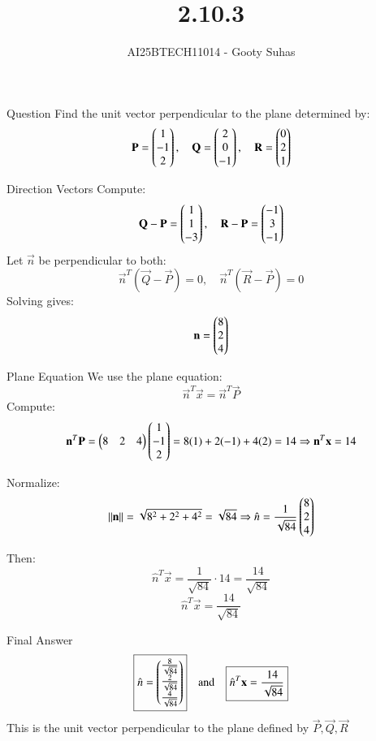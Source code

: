 \documentclass{beamer}
\title{2.10.3}
\author{AI25BTECH11014 - Gooty Suhas}
\begin{document}
\frame{\titlepage}

\begin{frame}{Question}
Find the unit vector perpendicular to the plane determined by:
\[
\mathbf{P} = \begin{pmatrix}1 \\ -1 \\ 2\end{pmatrix},\quad
\mathbf{Q} = \begin{pmatrix}2 \\ 0 \\ -1\end{pmatrix},\quad
\mathbf{R} = \begin{pmatrix}0 \\ 2 \\ 1\end{pmatrix}
\]
\end{frame}



\begin{frame}{Direction Vectors}
Compute:
\[
\mathbf{Q} - \mathbf{P} = \begin{pmatrix}1 \\ 1 \\ -3\end{pmatrix},\quad
\mathbf{R} - \mathbf{P} = \begin{pmatrix}-1 \\ 3 \\ -1\end{pmatrix}
\]
Let \( \vec{n} \) be perpendicular to both:
\[
\vec{n}^T (\vec{Q} - \vec{P}) = 0,\quad
\vec{n}^T (\vec{R} - \vec{P}) = 0
\]
Solving gives:
\[
\mathbf{n} = \begin{pmatrix}8 \\ 2 \\ 4\end{pmatrix}
\]
\end{frame}


\begin{frame}{Plane Equation}
We use the plane equation:
\[
\vec{n}^T \vec{x} = \vec{n}^T \vec{P}
\]
Compute:
\[
\mathbf{n}^T \mathbf{P} = \begin{pmatrix}8 & 2 & 4\end{pmatrix} \begin{pmatrix}1 \\ -1 \\ 2\end{pmatrix}
= 8(1) + 2(-1) + 4(2) = 14
\Rightarrow \mathbf{n}^T \mathbf{x} = 14
\]

Normalize:
\[
\|\mathbf{n}\| = \sqrt{8^2 + 2^2 + 4^2} = \sqrt{84}
\Rightarrow \hat{n} = \frac{1}{\sqrt{84}} \begin{pmatrix}8 \\ 2 \\ 4\end{pmatrix}
\]

Then:
\[
\hat{n}^T \vec{x} = \frac{1}{\sqrt{84}} \cdot 14 = \frac{14}{\sqrt{84}}
\]
\[
\boxed{\hat{n}^T \vec{x} = \frac{14}{\sqrt{84}}}
\]
\end{frame}

\begin{frame}{Final Answer}
\[
\boxed{
\hat{n} = \begin{pmatrix}\frac{8}{\sqrt{84}} \\
\frac{2}{\sqrt{84}} \\
\frac{4}{\sqrt{84}}\end{pmatrix}
}
\quad \text{and} \quad
\boxed{
\hat{n}^T \mathbf{x} = \frac{14}{\sqrt{84}}
}
\]
This is the unit vector perpendicular to the plane
defined by \( \vec{P}, \vec{Q}, \vec{R} \)
\end{frame}
\end{document}
